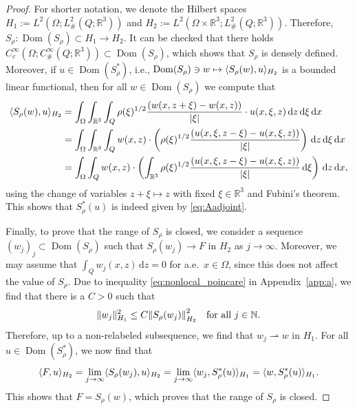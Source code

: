 \documentclass[reqno,11pt]{amsart}
\numberwithin{equation}{section}
\theoremstyle{thmlemcorr}
\numberwithin{theorem}{section}
\theoremstyle{thmlemcorr*}
\theoremstyle{defi}
\theoremstyle{remexample}
\theoremstyle{ass}
\newcommand{\N}{\mathbb{N}}
\newcommand{\R}{\mathbb{R}}
\newcommand{\dd}{\,\mathrm{d}}
\DeclarePairedDelimiter{\abs}{\lvert}{\rvert}
\DeclarePairedDelimiter{\norm}{\lVert}{\rVert}
\DeclarePairedDelimiter{\inner}{\langle}{\rangle}
\newcommand{\1}{\mathds{1}}
\DeclareMathOperator{\Dom}{Dom}
\newcommand{\comment}[1]{{\textcolor{red}{$\langle\hspace{-0.3ex}\langle$Leon: #1$\rangle\hspace{-0.3ex}\rangle$}}}
\begin{document}
\begin{proof}
    For shorter notation, we denote the Hilbert spaces $H_1:=L^2(\Omega ;L^2_{\#}(Q;\R^3))$ and $H_2:=L^2(\Omega\times\R^3;L^2_{\#}(Q;\R^3))$. Therefore, $S_\rho : \Dom(S_\rho) \subset H_1 \to H_2.$ It can be checked that there holds $C_c^{\infty}(\Omega;C^\infty_{\#}(Q;\R^3)) \subset \Dom(S_\rho)$, which shows that $S_\rho$ is densely defined. Moreover, if $u \in \Dom(S^*_\rho)$, i.e., $\Dom(S_\rho) \ni w \mapsto \inner{S_\rho(w),u}_{H_2}$ is a bounded linear functional, then for all $w \in \Dom(S_\rho)$ we compute that
    \begin{align*}
        \inner{S_\rho(w),u}_{H_2} &= \int_{\Omega}\int_{\R^3}\int_{Q} \rho(\xi)^{1/2}\frac{(w(x,z+\xi)-w(x,z))}{|\xi|}\cdot u(x,\xi,z)\dd z\dd \xi \dd x\\
        &= \int_{\Omega}\int_{\R^3}\int_{Q} w(x,z) \cdot \left(\rho(\xi)^{1/2}\frac{(u(x,\xi,z-\xi)-u(x,\xi,z))}{|\xi|}\right)\dd z\dd \xi \dd x \\
        &=\int_{\Omega}\int_{Q} w(x,z) \cdot\left(\int_{\R^3}\rho(\xi)^{1/2}\frac{(u(x,\xi,z-\xi)-u(x,\xi,z))}{|\xi|}\dd \xi \right) \dd z\dd x,
    \end{align*}
    using the change of variables $z + \xi \mapsto z$ with fixed $\xi \in \R^3$ and Fubini's theorem. This shows that $S_\rho^*(u)$ is indeed given by \eqref{eq:Aadjoint}.
    
    Finally, to prove that the range of $S_\rho$ is closed, we consider a sequence $(w_j)_j \subset \Dom(S_\rho)$ such that $S_\rho(w_j) \to F$ in $H_2$ as $j \to \infty$. Moreover, we may assume that $\int_{Q}w_j(x,z)\dd z=0$ for a.e.~$x \in \Omega$, since this does not affect the value of $S_\rho$. 
    Due to inequality \eqref{eq:nonlocal_poincare} in Appendix~\ref{app:a}, we find that there is a $C>0$ such that
    \[
    \norm{w_j}^2_{H_1} \leq C\norm*{S_\rho(w_j)}^2_{H_2} \quad \text{for all $j \in \N$}.
    \]
    Therefore, up to a non-relabeled subsequence, we find that $w_j \rightharpoonup w$ in $H_1$. For all $u \in \Dom(S_\rho^*)$, we now find that
    \[
    \inner{F,u}_{H_2}=\lim_{j \to \infty} \inner{S_\rho(w_j),u}_{H_2}=\lim_{j \to \infty} \inner{w_j, S_\rho^*(u)}_{H_1} = \inner{w,S_\rho^*(u)}_{H_1}.
    \]
    This shows that $F=S_\rho(w)$, which proves that the range of $S_\rho$ is closed.
\end{proof}
\end{document}
